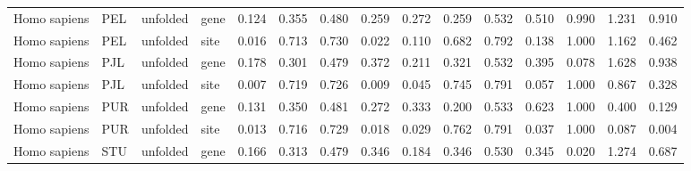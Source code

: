 \begin{longtable}{llllrrrrrrrrrrr}
        Homo sapiens &                       PEL &  unfolded &  gene &                              0.124 &                               0.355 &                 0.480 &                 0.259 &                              0.272 &                               0.259 &                 0.532 &                 0.510 &        0.990 &  1.231 &  0.910 \\
        Homo sapiens &                       PEL &  unfolded &  site &                              0.016 &                               0.713 &                 0.730 &                 0.022 &                              0.110 &                               0.682 &                 0.792 &                 0.138 &        1.000 &  1.162 &  0.462 \\
        Homo sapiens &                       PJL &  unfolded &  gene &                              0.178 &                               0.301 &                 0.479 &                 0.372 &                              0.211 &                               0.321 &                 0.532 &                 0.395 &        0.078 &  1.628 &  0.938 \\
        Homo sapiens &                       PJL &  unfolded &  site &                              0.007 &                               0.719 &                 0.726 &                 0.009 &                              0.045 &                               0.745 &                 0.791 &                 0.057 &        1.000 &  0.867 &  0.328 \\
        Homo sapiens &                       PUR &  unfolded &  gene &                              0.131 &                               0.350 &                 0.481 &                 0.272 &                              0.333 &                               0.200 &                 0.533 &                 0.623 &        1.000 &  0.400 &  0.129 \\
        Homo sapiens &                       PUR &  unfolded &  site &                              0.013 &                               0.716 &                 0.729 &                 0.018 &                              0.029 &                               0.762 &                 0.791 &                 0.037 &        1.000 &  0.087 &  0.004 \\
        Homo sapiens &                       STU &  unfolded &  gene &                              0.166 &                               0.313 &                 0.479 &                 0.346 &                              0.184 &                               0.346 &                 0.530 &                 0.345 &        0.020 &  1.274 &  0.687 \\

\end{longtable}
